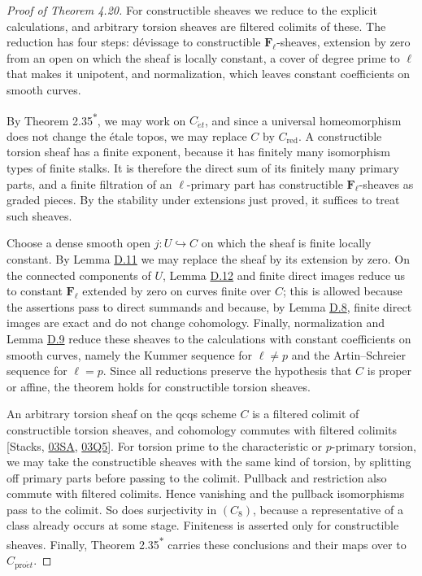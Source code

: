\documentclass[11pt]{article}
\newcommand{\bpout}[1]{#1\textsuperscript{\hyperlink{bp-outside}{\ensuremath{\ast}}}}
\begin{document}
\begin{proof}[{Proof of Theorem 4.20}]\label{bp220}%
For constructible sheaves we reduce to the explicit calculations, and arbitrary torsion sheaves are filtered colimits of these. The reduction has four steps: dévissage to constructible \(\mathbf F_\ell\)-sheaves, extension by zero from an open on which the sheaf is locally constant, a cover of degree prime to \(\ell\) that makes it unipotent, and normalization, which leaves constant coefficients on smooth curves.

By Theorem \bpout{2.35}, we may work on \(C_{\acute{e}t}\), and since a universal homeomorphism does not change the étale topos, we may replace \(C\) by \(C_{\mathrm{red}}\).  A constructible torsion sheaf has a finite exponent, because it has finitely many isomorphism types of finite stalks.  It is therefore the direct sum of its finitely many primary parts, and a finite filtration of an \(\ell\)-primary part has constructible \(\mathbf F_\ell\)-sheaves as graded pieces.  By the stability under extensions just proved, it suffices to treat such sheaves.

Choose a dense smooth open \(j:U\hookrightarrow C\) on which the sheaf is finite locally constant.  By Lemma \hyperref[bp210]{D.11} we may replace the sheaf by its extension by zero.  On the connected components of \(U\), Lemma \hyperref[bp215]{D.12} and finite direct images reduce us to constant \(\mathbf F_\ell\) extended by zero on curves finite over \(C\); this is allowed because the assertions pass to direct summands and because, by Lemma \hyperref[bp199]{D.8}, finite direct images are exact and do not change cohomology.  Finally, normalization and Lemma \hyperref[bp202]{D.9} reduce these sheaves to the calculations with constant coefficients on smooth curves, namely the Kummer sequence for \(\ell\ne p\) and the Artin–Schreier sequence for \(\ell=p\).  Since all reductions preserve the hypothesis that \(C\) is proper or affine, the theorem holds for constructible torsion sheaves.

An arbitrary torsion sheaf on the qcqs scheme \(C\) is a filtered colimit of constructible torsion sheaves, and cohomology commutes with filtered colimits [Stacks, \href{https://stacks.math.columbia.edu/tag/03SA}{03SA}, \href{https://stacks.math.columbia.edu/tag/03Q5}{03Q5}].  For torsion prime to the characteristic or \(p\)-primary torsion, we may take the constructible sheaves with the same kind of torsion, by splitting off primary parts before passing to the colimit. Pullback and restriction also commute with filtered colimits. Hence vanishing and the pullback isomorphisms pass to the colimit. So does surjectivity in \((C_8)\), because a representative of a class already occurs at some stage. Finiteness is asserted only for constructible sheaves. Finally, Theorem \bpout{2.35} carries these conclusions and their maps over to \(C_{\mathrm{pro}\acute{e}t}\).
\end{proof}
\end{document}
